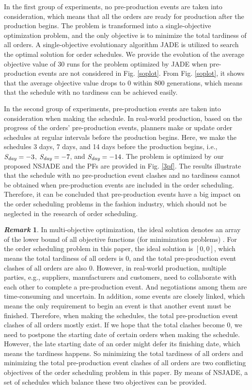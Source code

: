 \documentclass[journal]{IEEEtran}
\theoremstyle{definition}
\newtheorem{remark}{\it Remark}
\begin{document}
In the first group of experiments, no pre-production events are taken into consideration, which means that all the orders are ready for production after the production begins. The problem is transformed into a single-objective optimization problem, and the only objective is to minimize the total tardiness of all orders. A single-objective evolutionary algorithm JADE \cite{zhang2009jade} is utilized to search the optimal solution for order schedules. We provide the evolution of the average objective value of 30 runs for the problem optimized by JADE when pre-production events are not considered in Fig. \ref{soplot}. From Fig. \ref{soplot}, it shows that the average objective value drops to 0 within 800 generations, which means that the schedule with no tardiness can be achieved easily.

In the second group of experiments, pre-production events are taken into consideration when making the schedule. In real-world production, based on the progress of the orders' pre-production events, planners make or update order schedules at regular intervals before the production begins. Here, we make the schedules 3 days, 7 days, and 14 days before the production begins, i.e., $\emph{S}_\emph{day}=-3$, $\emph{S}_\emph{day}=-7$, and $\emph{S}_\emph{day}=-14$. The problem is optimized by our proposed NSJADE and the PFs are provided in Fig. \ref{3pf}. The results illustrate that the schedule with no pre-production event clashes and no tardiness cannot be obtained when pre-production events are included in the order scheduling. Therefore, it can be concluded that pre-production events have a big impact on the order scheduling problems in the fashion industry, which should not be neglected in the research of order scheduling.

\begin{remark}
In multi-objective optimization, the ideal solution denotes an array of the lower bound of all objective functions (for minimization problems) \cite{deb2001multi}. For the order scheduling problem in this paper, the ideal solution is $[0, 0]$, which means the total tardiness of all orders is 0, and the total pre-production event clashes of all orders are also 0. However, in real-world production, multiple parties, e.g., suppliers, manufacturers and customers, need to collaborate with each other to complete a pre-production event. And negotiations among them are time-consuming and uncertain. In addition, some events are closely linked, which means the only requirement to begin an event is that another event must be finished.
Therefore, when making the schedules, the total pre-production event clashes of all orders mostly exist. If we hope that the total clashes become 0, we need to postpone the starting date of certain orders when making the schedule. However, the late starting date of an order might defer its finishing date, which means the tardiness happens. So minimizing the total tardiness of all orders and minimizing the total pre-production event clashes of all orders are two conflicting objectives of the order scheduling problem in this paper.
By means of NSJADE, a set of schedules which balance these two objectives can be provided.
\end{remark}
\end{document}
